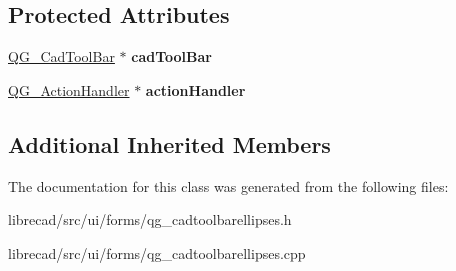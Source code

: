 \subsection*{Protected Attributes}
\begin{DoxyCompactItemize}
\item 
\hypertarget{classQG__CadToolBarEllipses_a8842aca25003638d1a1f9ce6aeef16ab}{\hyperlink{classQG__CadToolBar}{Q\-G\-\_\-\-Cad\-Tool\-Bar} $\ast$ {\bfseries cad\-Tool\-Bar}}\label{classQG__CadToolBarEllipses_a8842aca25003638d1a1f9ce6aeef16ab}

\item 
\hypertarget{classQG__CadToolBarEllipses_a800cfe7aa511e22f60758b8c9a36c39c}{\hyperlink{classQG__ActionHandler}{Q\-G\-\_\-\-Action\-Handler} $\ast$ {\bfseries action\-Handler}}\label{classQG__CadToolBarEllipses_a800cfe7aa511e22f60758b8c9a36c39c}

\end{DoxyCompactItemize}
\subsection*{Additional Inherited Members}


The documentation for this class was generated from the following files\-:\begin{DoxyCompactItemize}
\item 
librecad/src/ui/forms/qg\-\_\-cadtoolbarellipses.\-h\item 
librecad/src/ui/forms/qg\-\_\-cadtoolbarellipses.\-cpp\end{DoxyCompactItemize}
